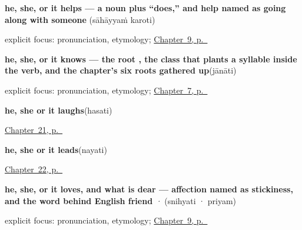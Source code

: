 \noindent\begin{minipage}[t]{\linewidth}
\raggedright
\textbf{he, she, or it helps — a noun plus \textquotedblleft{}does,\textquotedblright{} and help named as going along with someone}\enspace\emph{ }\enspace(sāhāyyaṁ karoti)\par
\footnotesize explicit focus: pronunciation, etymology; \hyperref[ch:sa-doing-verbs]{Chapter~9, p.~\pageref*{ch:sa-doing-verbs}}
\end{minipage}\par\smallskip

\noindent\begin{minipage}[t]{\linewidth}
\raggedright
\textbf{he, she, or it knows — the root , the class that plants a syllable inside the verb, and the chapter's six roots gathered up}\enspace\emph{}\enspace(jānāti)\par
\footnotesize explicit focus: pronunciation, etymology; \hyperref[ch:sa-core-verbs]{Chapter~7, p.~\pageref*{ch:sa-core-verbs}}
\end{minipage}\par\smallskip

\noindent\begin{minipage}[t]{\linewidth}
\raggedright
\textbf{he, she or it laughs}\enspace\emph{}\enspace(hasati)\par
\footnotesize \hyperref[ch:sa-more-verbs]{Chapter~21, p.~\pageref*{ch:sa-more-verbs}}
\end{minipage}\par\smallskip

\noindent\begin{minipage}[t]{\linewidth}
\raggedright
\textbf{he, she or it leads}\enspace\emph{}\enspace(nayati)\par
\footnotesize \hyperref[ch:sa-verbs-of-mind]{Chapter~22, p.~\pageref*{ch:sa-verbs-of-mind}}
\end{minipage}\par\smallskip

\noindent\begin{minipage}[t]{\linewidth}
\raggedright
\textbf{he, she, or it loves, and what is dear — affection named as stickiness, and the word behind English friend}\enspace\emph{ · }\enspace(snihyati · priyam)\par
\footnotesize explicit focus: pronunciation, etymology; \hyperref[ch:sa-doing-verbs]{Chapter~9, p.~\pageref*{ch:sa-doing-verbs}}
\end{minipage}\par\smallskip

